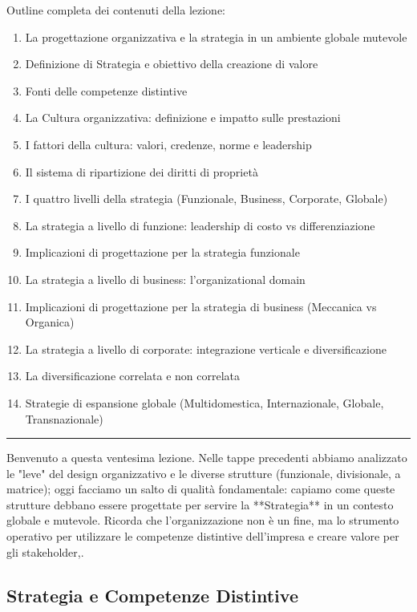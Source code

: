 \documentclass[a4paper,10pt]{article}
\begin{document}
Outline completa dei contenuti della lezione:
{\small
\begin{enumerate}
\item La progettazione organizzativa e la strategia in un ambiente globale mutevole
\item Definizione di Strategia e obiettivo della creazione di valore
\item Fonti delle competenze distintive
\item La Cultura organizzativa: definizione e impatto sulle prestazioni
\item I fattori della cultura: valori, credenze, norme e leadership
\item Il sistema di ripartizione dei diritti di proprietà
\item I quattro livelli della strategia (Funzionale, Business, Corporate, Globale)
\item La strategia a livello di funzione: leadership di costo vs differenziazione
\item Implicazioni di progettazione per la strategia funzionale
\item La strategia a livello di business: l'organizational domain
\item Implicazioni di progettazione per la strategia di business (Meccanica vs Organica)
\item La strategia a livello di corporate: integrazione verticale e diversificazione
\item La diversificazione correlata e non correlata
\item Strategie di espansione globale (Multidomestica, Internazionale, Globale, Transnazionale)
\end{enumerate}
}
\hrule
\vspace{0.5cm}

Benvenuto a questa ventesima lezione. Nelle tappe precedenti abbiamo analizzato le "leve" del design organizzativo e le diverse strutture (funzionale, divisionale, a matrice); oggi facciamo un salto di qualità fondamentale: capiamo come queste strutture debbano essere progettate per servire la **Strategia** in un contesto globale e mutevole. Ricorda che l'organizzazione non è un fine, ma lo strumento operativo per utilizzare le competenze distintive dell'impresa e creare valore per gli stakeholder,.

\subsection*{Strategia e Competenze Distintive}
\end{document}
